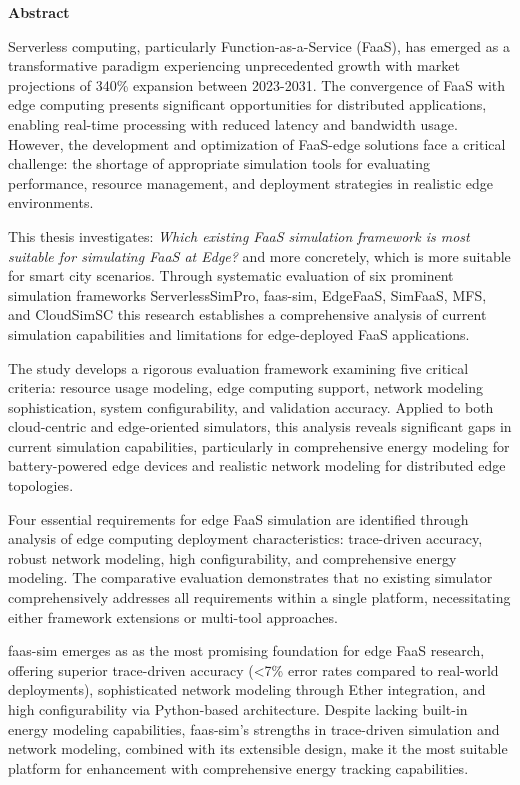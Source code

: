 \vspace*{4cm}
\begin{center}
    {\Large\bf Abstract}
\end{center} \vskip 0.5cm

Serverless computing, particularly Function-as-a-Service (FaaS), has emerged as a transformative paradigm experiencing unprecedented growth with market projections of 340\% expansion between 2023-2031. The convergence of FaaS with edge computing presents significant opportunities for distributed applications, enabling real-time processing with reduced latency and bandwidth usage. However, the development and optimization of FaaS-edge solutions face a critical challenge: the shortage of appropriate simulation tools for evaluating performance, resource management, and deployment strategies in realistic edge environments.

This thesis investigates: \textit{Which existing FaaS simulation framework is most suitable for simulating FaaS at Edge?} and more concretely, which is more suitable for smart city scenarios. Through systematic evaluation of six prominent simulation frameworks ServerlessSimPro, faas-sim, EdgeFaaS, SimFaaS, MFS, and CloudSimSC this research establishes a comprehensive analysis of current simulation capabilities and limitations for edge-deployed FaaS applications.

The study develops a rigorous evaluation framework examining five critical criteria: resource usage modeling, edge computing support, network modeling sophistication, system configurability, and validation accuracy. Applied to both cloud-centric and edge-oriented simulators, this analysis reveals significant gaps in current simulation capabilities, particularly in comprehensive energy modeling for battery-powered edge devices and realistic network modeling for distributed edge topologies.

Four essential requirements for edge FaaS simulation are identified through analysis of edge computing deployment characteristics: trace-driven accuracy, robust network modeling, high configurability, and comprehensive energy modeling. The comparative evaluation demonstrates that no existing simulator comprehensively addresses all requirements within a single platform, necessitating either framework extensions or multi-tool approaches.

faas-sim emerges as as the most promising foundation for edge FaaS research, offering superior trace-driven accuracy (<7\% error rates compared to real-world deployments), sophisticated network modeling through Ether integration, and high configurability via Python-based architecture. Despite lacking built-in energy modeling capabilities, faas-sim's strengths in trace-driven simulation and network modeling, combined with its extensible design, make it the most suitable platform for enhancement with comprehensive energy tracking capabilities.


